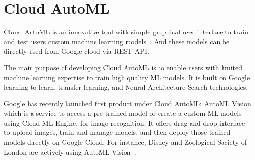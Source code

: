 \section{Cloud AutoML}

Cloud AutoML is an innovative tool with simple graphical user interface to train
and test users custom machine learning models~\cite{hid-sp18-602-www-cloudautoml-main}.
And these models can be directly used from Google cloud via REST API. 

The main purpose of developing Cloud AutoML is to enable users with limited 
machine learning expertise to train high quality ML models. It is built on Google
learning to learn, transfer learning, and Neural Architecture Search 
technologies.

Google has recently launched first product under Cloud AutoML: AutoML Vision 
which is a service to access a pre-trained model or create a custom ML models using
Cloud ML Engine, for image recognition. It offers drag-and-drop interface to 
upload images, train and manage models, and then deploy those trained models 
directly on Google Cloud. For instance, Disney and Zoological Society of London are
actively using AutoML Vision~\cite{hid-sp18-602-wwww-cloudautoml-blog}.

